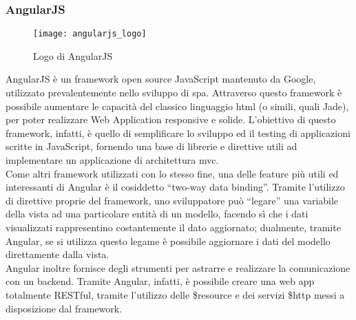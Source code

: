 \subsubsection{AngularJS}
\begin{figure}[H] 
    \centering 
    \texttt{[image: angularjs\_logo]} 
    \caption{Logo di AngularJS}
\end{figure}
AngularJS è un framework open source JavaScript mantenuto da Google, utilizzato prevalentemente nello sviluppo di \gls{spa}. Attraverso questo framework è possibile aumentare le capacità del classico linguaggio \gls{html} (o simili, quali Jade), per poter realizzare Web Application responsive e solide. 
L’obiettivo di questo framework, infatti, è quello di semplificare lo sviluppo ed il testing di applicazioni scritte in JavaScript, fornendo una base di librerie e direttive utili ad implementare un applicazione di architettura \gls{mvc}.\\
Come altri framework utilizzati con lo stesso fine, una delle feature più utili ed interessanti di Angular è il cosiddetto “two-way data binding”. Tramite l’utilizzo di direttive proprie del framework, uno sviluppatore può “legare” una variabile della vista ad una particolare entità di un modello, facendo sì che i dati visualizzati rappresentino costantemente il dato aggiornato; dualmente, tramite Angular, se si utilizza questo legame è possibile aggiornare i dati del modello direttamente dalla vista.\\
Angular inoltre fornisce degli strumenti per astrarre e realizzare la comunicazione con un backend. Tramite Angular, infatti, è possibile creare una web app totalmente RESTful, tramite l’utilizzo delle \$resource e dei servizi \$http messi a disposizione dal framework.

